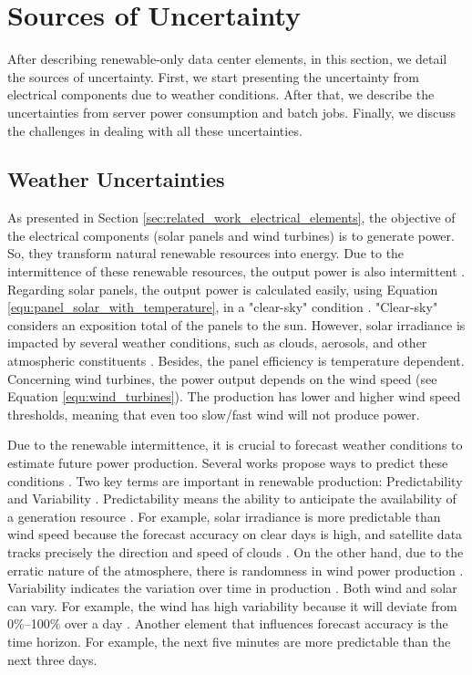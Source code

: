 \section{Sources of Uncertainty}

After describing renewable-only data center elements, in this section, we detail the sources of uncertainty. First, we start presenting the uncertainty from electrical components due to weather conditions. After that, we describe the uncertainties from server power consumption and batch jobs. Finally, we discuss the challenges in dealing with all these uncertainties.

\subsection{Weather Uncertainties}
\label{sec:weather_uncertainties}

As presented in Section \ref{sec:related_work_electrical_elements}, the objective of the electrical components (solar panels and wind turbines) is to generate power. So, they transform natural renewable resources into energy. Due to the intermittence of these renewable resources, the output power is also intermittent \cite{perez2011managing}. Regarding solar panels, the output power is calculated easily, using Equation \ref{equ:panel_solar_with_temperature}, in a "clear-sky" condition \cite{tuohy2015solar}. "Clear-sky" considers an exposition total of the panels to the sun. However, solar irradiance is impacted by several weather conditions, such as clouds, aerosols, and other atmospheric constituents \cite{tuohy2015solar}. Besides, the panel efficiency is temperature dependent. Concerning wind turbines, the power output depends on the wind speed (see Equation \ref{equ:wind_turbines}). The production has lower and higher wind speed thresholds, meaning that even too slow/fast wind will not produce power. 

Due to the renewable intermittence, it is crucial to forecast weather conditions to estimate future power production. Several works propose ways to predict these conditions \cite{tuohy2015solar, soman2010review, sharma2018review, ssekulima2016wind}. Two key terms are important in renewable production: Predictability and Variability \cite{ssekulima2016wind, perez2011managing}. Predictability means the ability to anticipate the availability of a generation resource \cite{perez2011managing}. For example, solar irradiance is more predictable than wind speed because the forecast accuracy on clear days is high, and satellite data tracks precisely the direction and speed of clouds \cite{perez2011managing}. On the other hand, due to the erratic nature of the atmosphere, there is randomness in wind power production \cite{sharma2018review}. Variability indicates the variation over time in production \cite{perez2011managing}. Both wind and solar can vary. For example, the wind has high variability because it will deviate from 0\%–100\% over a day \cite{perez2011managing}. Another element that influences forecast accuracy is the time horizon. For example, the next five minutes are more predictable than the next three days.

